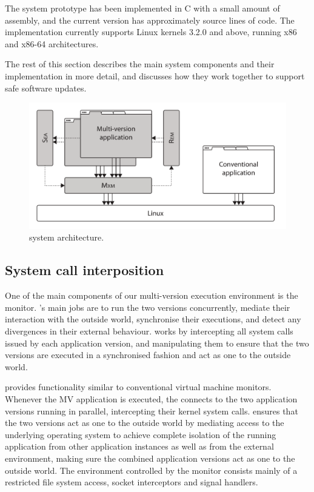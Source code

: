 The system prototype has been implemented in C with a small amount of
assembly, and the current version has approximately \mxSLOC source
lines of code. The implementation currently supports Linux kernels
3.2.0 and above, running x86 and x86-64 architectures.

The rest of this section describes the main \mx system components and
their implementation in more detail, and discusses how they work
together to support safe software updates.

\begin{figure}[t!]
\begin{center}
\includegraphics[width=0.75\columnwidth]{safe-updates/figures/architecture}
\caption{\mx system architecture.  
}
\label{fig:design}
\end{center}
\end{figure}


\subsection{System call interposition}
\label{sec:mxm}

One of the main components of our multi-version execution environment
is the \mxm monitor.  \mxm's main jobs are to run the two versions
concurrently, mediate their interaction with the outside world,
synchronise their executions, and detect any divergences in their
external behaviour. \mxm works by intercepting all system calls issued
by each application version, and manipulating them to ensure that the
two versions are executed in a synchronised fashion and act as one to
the outside world.

\mxm provides functionality similar to conventional virtual machine monitors.
Whenever the MV application is executed, the \mxm connects to the two
application versions running in parallel, intercepting their kernel system
calls.  \mxm ensures that the two versions act as one to the outside world by
mediating access to the underlying operating system to achieve complete
isolation of the running application from other application instances as well
as from the external environment, making sure the combined application versions
act as one to the outside world.  The environment controlled by the monitor
consists mainly of a restricted file system access, socket interceptors and
signal handlers.

